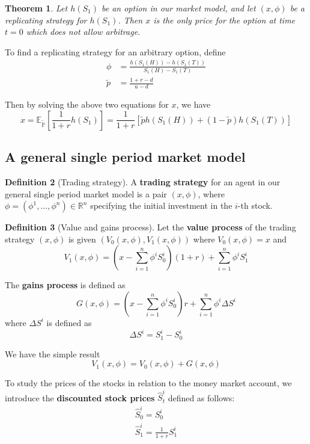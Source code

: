 \documentclass[10pt, oneside, reqno]{amsart}
\theoremstyle{plain}%
\newtheorem{thm}{Theorem}[subsection]
\theoremstyle{definition}
\newtheorem{defn}[thm]{Definition}
\theoremstyle{remark}
\newcommand{\R}{\mathbb{R}}
\newcommand{\tilp}{\tilde{p}}
\newcommand{\rnm}{\tilde{\mathbb{P}}}
\begin{document}
\begin{thm}
	Let $h(S_1)$ be an option in our market model, and let $(x,\phi)$ be a replicating strategy for $h(S_1)$. Then $x$ is the only price for the option at time $t=0$ which does not allow arbitrage.  
\end{thm}


To find a replicating strategy for an arbitrary option, define \begin{align*}
	\phi &= \frac{h(S_1(H)) - h(S_1(T))}{S_1(H) - S_1(T)} \\
	\tilp &= \frac{1 + r - d}{u - d}
\end{align*}

Then by solving the above two equations for $x$, we have \[
	x = \mathbb{E}_{\rnm}\left[\frac{1}{1+r} h(S_1)\right] = \frac{1}{1+r}\left[\tilp h(S_1(H)) + (1-\tilp) h(S_1(T))\right]
\]



\subsection{A general single period market model} %
\label{sub:a_general_single_period_market_model}


\begin{defn}[Trading strategy]
	A \textbf{trading strategy} for an agent in our general single period market model is a pair $(x,\phi)$, where $\phi = (\phi^1, \dots,\phi^n) \in \R^n$ specifying the initial investment in the $i$-th stock.
\end{defn}


\begin{defn}[Value and gains process]
	Let the \textbf{value process} of the trading strategy $(x,\phi)$ is given $(V_0(x,\phi), V_1(x,\phi))$ where $V_0(x,\phi) = x$ and \[
		V_1(x,\phi) = (x - \sum_{i=1}^n \phi^i S_0^i)(1+r) + \sum_{i=1}^n \phi^i S_1^i
	\]

	The \textbf{gains process} is defined as \[
		G(x,\phi) = (x - \sum_{i=1}^n \phi^i S^i_0) r + \sum_{i=1}^n \phi^i \Delta S^i
	\]
	where $\Delta S^i$ is defined as \[
		\Delta S^i = S^i_1 - S^i_0
	\]
\end{defn}

We have the simple result \[
	V_1(x,\phi) = V_0(x,\phi) + G(x,\phi)
\]

To study the prices of the stocks in relation to the money market account, we introduce the \textbf{discounted stock prices} $\hat{S}^i_t$ defined as follows: \begin{align*}
	\hat{S}^i_0 = S^i_0 \\
	\hat{S}^i_1 = \frac{1}{1+r} S^i_1
\end{align*}
\end{document}

